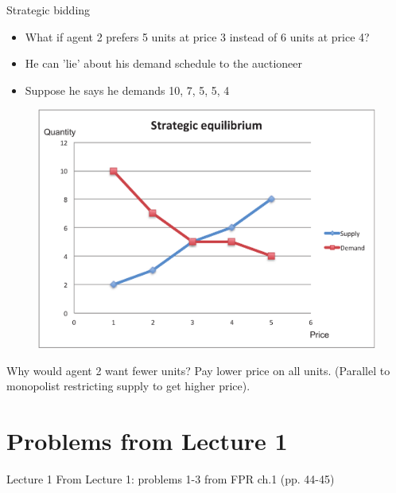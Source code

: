 \documentclass[english,10pt]{beamer}
\theoremstyle{definition}
\begin{document}
\begin{frame}{Strategic bidding}
	\begin{itemize}
		\item What if agent 2 prefers 5 units at price 3 instead of 6 units at price 4?
		\item He can 'lie' about his demand schedule to the auctioneer
		\item Suppose he says he demands 10, 7, 5, 5, 4
	\end{itemize}
	\begin{figure}
		\includegraphics[width=.4\paperwidth]{pics/Image_Strategic2}
	\end{figure}
	Why would agent 2 want fewer units? Pay lower price on all units. (Parallel to monopolist restricting supply to get higher price). \hyperlink{main2}{}
\end{frame}



\section{Problems from Lecture 1}

\begin{frame}{Lecture 1}
	From Lecture 1: problems 1-3 from FPR ch.1 (pp. 44-45)
\end{frame}
\end{document}

